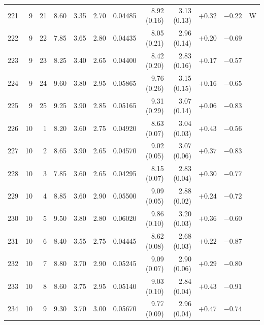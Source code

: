 \begin{longtable}{@{}rrrrrrrrrrrr@{}}
221 & 9 & 21 & \num{8.60} & \num{3.35} & \num{2.70} & \num{0.04485} & \num{8.92} (\num{0.16}) & \num{3.13} (\num{0.13}) & $+\num{0.32}$ & $-\num{0.22}$ & W \\
222 & 9 & 22 & \num{7.85} & \num{3.65} & \num{2.80} & \num{0.04435} & \num{8.05} (\num{0.21}) & \num{2.96} (\num{0.14}) & $+\num{0.20}$ & $-\num{0.69}$ &  \\
223 & 9 & 23 & \num{8.25} & \num{3.40} & \num{2.65} & \num{0.04400} & \num{8.42} (\num{0.20}) & \num{2.83} (\num{0.16}) & $+\num{0.17}$ & $-\num{0.57}$ &  \\
224 & 9 & 24 & \num{9.60} & \num{3.80} & \num{2.95} & \num{0.05865} & \num{9.76} (\num{0.26}) & \num{3.15} (\num{0.15}) & $+\num{0.16}$ & $-\num{0.65}$ &  \\
225 & 9 & 25 & \num{9.25} & \num{3.90} & \num{2.85} & \num{0.05165} & \num{9.31} (\num{0.29}) & \num{3.07} (\num{0.14}) & $+\num{0.06}$ & $-\num{0.83}$ &  \\
226 & 10 & 1 & \num{8.20} & \num{3.60} & \num{2.75} & \num{0.04920} & \num{8.63} (\num{0.07}) & \num{3.04} (\num{0.03}) & $+\num{0.43}$ & $-\num{0.56}$ &  \\
227 & 10 & 2 & \num{8.65} & \num{3.90} & \num{2.65} & \num{0.04570} & \num{9.02} (\num{0.05}) & \num{3.07} (\num{0.06}) & $+\num{0.37}$ & $-\num{0.83}$ &  \\
228 & 10 & 3 & \num{7.85} & \num{3.60} & \num{2.65} & \num{0.04295} & \num{8.15} (\num{0.07}) & \num{2.83} (\num{0.04}) & $+\num{0.30}$ & $-\num{0.77}$ &  \\
229 & 10 & 4 & \num{8.85} & \num{3.60} & \num{2.90} & \num{0.05500} & \num{9.09} (\num{0.05}) & \num{2.88} (\num{0.02}) & $+\num{0.24}$ & $-\num{0.72}$ &  \\
230 & 10 & 5 & \num{9.50} & \num{3.80} & \num{2.80} & \num{0.06020} & \num{9.86} (\num{0.10}) & \num{3.20} (\num{0.03}) & $+\num{0.36}$ & $-\num{0.60}$ &  \\
231 & 10 & 6 & \num{8.40} & \num{3.55} & \num{2.75} & \num{0.04445} & \num{8.62} (\num{0.08}) & \num{2.68} (\num{0.03}) & $+\num{0.22}$ & $-\num{0.87}$ &  \\
232 & 10 & 7 & \num{8.80} & \num{3.70} & \num{2.90} & \num{0.05245} & \num{9.09} (\num{0.07}) & \num{2.90} (\num{0.06}) & $+\num{0.29}$ & $-\num{0.80}$ &  \\
233 & 10 & 8 & \num{8.60} & \num{3.75} & \num{2.95} & \num{0.05140} & \num{9.03} (\num{0.10}) & \num{2.84} (\num{0.04}) & $+\num{0.43}$ & $-\num{0.91}$ &  \\
234 & 10 & 9 & \num{9.30} & \num{3.70} & \num{3.00} & \num{0.05670} & \num{9.77} (\num{0.09}) & \num{2.96} (\num{0.04}) & $+\num{0.47}$ & $-\num{0.74}$ &  \\

\end{longtable}
